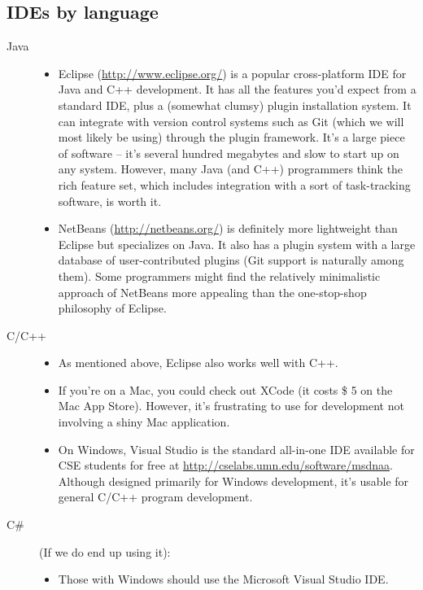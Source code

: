 \documentclass{article}
\begin{document}
\subsection{IDEs by language}
\begin{description}
    \item[Java] \hfill
        \begin{itemize}
            \item Eclipse (\url{http://www.eclipse.org/}) is a popular cross-platform IDE for Java and C++ development. It has all the features you'd expect from a standard IDE, plus a (somewhat clumsy) plugin installation system. It can integrate with version control systems such as Git (which we will most likely be using) through the plugin framework. It's a large piece of software -- it's several hundred megabytes and slow to start up on any system. However, many Java (and C++) programmers think the rich feature set, which includes integration with a sort of task-tracking software, is worth it. 
            \item NetBeans (\url{http://netbeans.org/}) is definitely more lightweight than Eclipse but specializes on Java. It also has a plugin system with a large database of user-contributed plugins (Git support is naturally among them). Some programmers might find the relatively minimalistic approach of NetBeans more appealing than the one-stop-shop philosophy of Eclipse.
        \end{itemize}
    \item[C/C++] \hfill
        \begin{itemize}
            \item As mentioned above, Eclipse also works well with C++. 
            \item If you're on a Mac, you could check out XCode (it costs \$ 5 on the Mac App Store). However, it's frustrating to use for development not involving a shiny Mac application. 
            \item On Windows, Visual Studio is the standard all-in-one IDE available for CSE students for free at \url{http://cselabs.umn.edu/software/msdnaa}. Although designed primarily for Windows development, it's usable for general C/C++ program development.
        \end{itemize}
    \item[C\#]
        (If we do end up using it): 
        \begin{itemize}
            \item Those with Windows should use the Microsoft Visual Studio IDE. 

\end{itemize}
\end{description}
\end{document}
